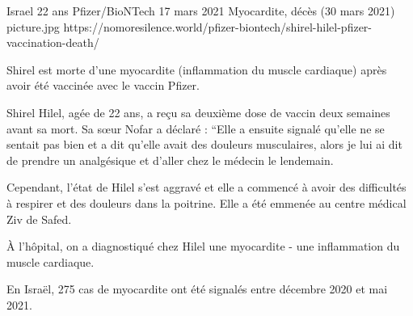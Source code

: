 {Israel}
{22 ans}
{Pfizer/BioNTech}
{17 mars 2021}
{Myocardite, décès (30 mars 2021)}
{picture.jpg}
{https://nomoresilence.world/pfizer-biontech/shirel-hilel-pfizer-vaccination-death/}
{

Shirel est morte d'une myocardite (inflammation du muscle cardiaque) après avoir
été vaccinée avec le vaccin Pfizer.

Shirel Hilel, agée de 22 ans, a reçu sa deuxième dose de vaccin deux semaines
avant sa mort. Sa sœur Nofar a déclaré : “Elle a ensuite signalé qu'elle ne se
sentait pas bien et a dit qu'elle avait des douleurs musculaires, alors je lui
ai dit de prendre un analgésique et d'aller chez le médecin le lendemain.

Cependant, l'état de Hilel s'est aggravé et elle a commencé à avoir des
difficultés à respirer et des douleurs dans la poitrine. Elle a été emmenée au
centre médical Ziv de Safed.

À l'hôpital, on a diagnostiqué chez Hilel une myocardite - une inflammation du
muscle cardiaque.

En Israël, 275 cas de myocardite ont été signalés entre décembre 2020 et mai
2021.

}
